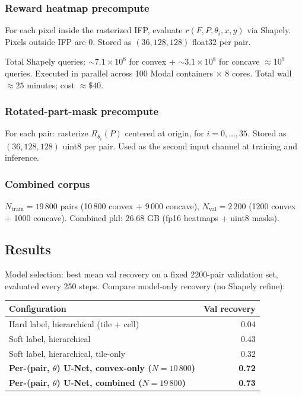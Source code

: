 \documentclass[11pt]{article}
\begin{document}
\subsubsection{Reward heatmap precompute}
For each pixel inside the rasterized IFP, evaluate $r(F, P, \theta_i, x, y)$ via Shapely.  Pixels outside IFP are 0.  Stored as $(36, 128, 128)$ float32 per pair.

Total Shapely queries: $\sim 7.1 \times 10^8$ for convex + $\sim 3.1 \times 10^8$ for concave $\approx 10^9$ queries.  Executed in parallel across 100 Modal containers $\times$ 8 cores.  Total wall $\approx 25$ minutes; cost $\approx \$40$.

\subsubsection{Rotated-part-mask precompute}
For each pair: rasterize $R_{\theta_i}(P)$ centered at origin, for $i = 0, \dots, 35$.  Stored as $(36, 128, 128)$ uint8 per pair.  Used as the second input channel at training and inference.

\subsubsection{Combined corpus}
$N_{\text{train}} = 19\,800$ pairs (10\,800 convex + 9\,000 concave), $N_{\text{val}} = 2\,200$ (1200 convex + 1000 concave).  Combined pkl: $26.68$ GB (fp16 heatmaps + uint8 masks).

\subsection{Results}

Model selection: best mean val recovery on a fixed 2200-pair validation set, evaluated every 250 steps.  Compare model-only recovery (no Shapely refine):

\begin{center}
\begin{tabular}{lr}
  \toprule
  Configuration & Val recovery \\
  \midrule
  Hard label, hierarchical (tile + cell)                          & 0.04 \\
  Soft label, hierarchical                                         & 0.43 \\
  Soft label, hierarchical, tile-only                              & 0.32 \\
  \textbf{Per-(pair, $\theta$) U-Net, convex-only ($N=10\,800$)}   & \textbf{0.72} \\
  \textbf{Per-(pair, $\theta$) U-Net, combined ($N=19\,800$)}      & \textbf{0.73} \\
  \bottomrule
\end{tabular}
\end{center}
\end{document}
